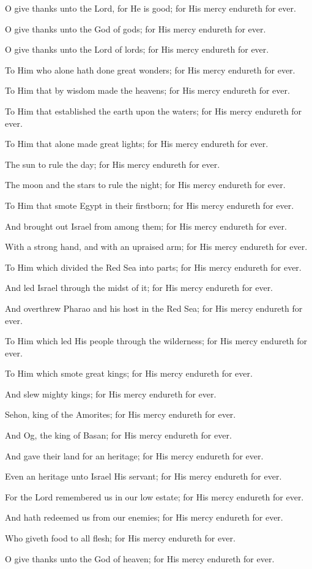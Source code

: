 O give thanks unto the Lord, for He is good; for His mercy endureth for ever.

O give thanks unto the God of gods; for His mercy endureth for ever.

O give thanks unto the Lord of lords; for His mercy endureth for ever.

To Him who alone hath done great wonders; for His mercy endureth for ever.

To Him that by wisdom made the heavens; for His mercy endureth for ever.

To Him that established the earth upon the waters; for His mercy endureth for ever.

To Him that alone made great lights; for His mercy endureth for ever.

The sun to rule the day; for His mercy endureth for ever.

The moon and the stars to rule the night; for His mercy endureth for ever.

To Him that smote Egypt in their firstborn; for His mercy endureth for ever.

And brought out Israel from among them; for His mercy endureth for ever.

With a strong hand, and with an upraised arm; for His mercy endureth for ever.

To Him which divided the Red Sea into parts; for His mercy endureth for ever.

And led Israel through the midst of it; for His mercy endureth for ever.

And overthrew Pharao and his host in the Red Sea; for His mercy endureth for ever.

To Him which led His people through the wilderness; for His mercy endureth for ever.

To Him which smote great kings; for His mercy endureth for ever.

And slew mighty kings; for His mercy endureth for ever.

Sehon, king of the Amorites; for His mercy endureth for ever.

And Og, the king of Basan; for His mercy endureth for ever.

And gave their land for an heritage; for His mercy endureth for ever.

Even an heritage unto Israel His servant; for His mercy endureth for ever.

For the Lord remembered us in our low estate; for His mercy endureth for ever.

And hath redeemed us from our enemies; for His mercy endureth for ever.

Who giveth food to all flesh; for His mercy endureth for ever.

O give thanks unto the God of heaven; for His mercy endureth for ever.

